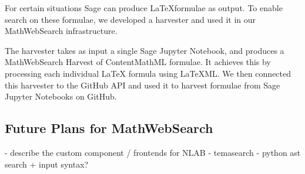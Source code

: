 For certain situations Sage can produce \LaTeX formulae as output. 
To enable search on these formulae, we developed a harvester and used it in our MathWebSearch infrastructure. 

The harvester takes as input a single Sage Jupyter Notebook, and produces a MathWebSearch Harvest of ContentMathML formulae. 
It achieves this by processing each individual LaTeX formula using LaTeXML. 
We then connected this harvester to the GitHub API and used it to harvest formulae from  Sage Jupyter Notebooks on GitHub. 


\subsection{Future Plans for MathWebSearch}

- describe the custom component / frontends for NLAB
- temasearch
- python ast search + input syntax?

